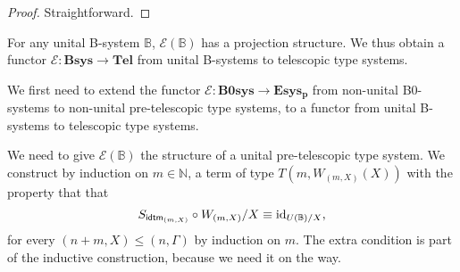 \begin{proof}
Straightforward.
\end{proof}

\begin{defn}
For any unital B-system $\mathbb{B}$, $\mathcal{E}(\mathbb{B})$ has a
projection structure. We thus obtain a functor 
$\mathcal{E}:\mathbf{Bsys}\to\mathbf{Tel}$ from unital B-systems to telescopic type systems.
\end{defn}

\begin{constr}
We first need to extend the functor $\mathcal{E}:\mathbf{B0sys}\to\mathbf{Esys_p}$
from non-unital B0-systems to non-unital pre-telescopic type systems, to a functor from
unital B-systems to telescopic type systems.

We need to give $\mathcal{E}(\mathbb{B})$ the structure of a unital
pre-telescopic type system. We construct by induction on $m\in \mathbb{N}$, a term of type 
$T(m,W_{(m,X)}(X))$ with the property that that 
\begin{equation*}
S_{\tfid{(m,X)}}\circ W_{(m,X)}/X\jdeq\catid{U(\mathbb{B})/X},
\end{equation*} 
for every $(n+m,X)\leq (n,\Gamma)$ by induction on $m$. The extra
condition is part of the inductive construction, because we need it on the way.


\end{constr}
